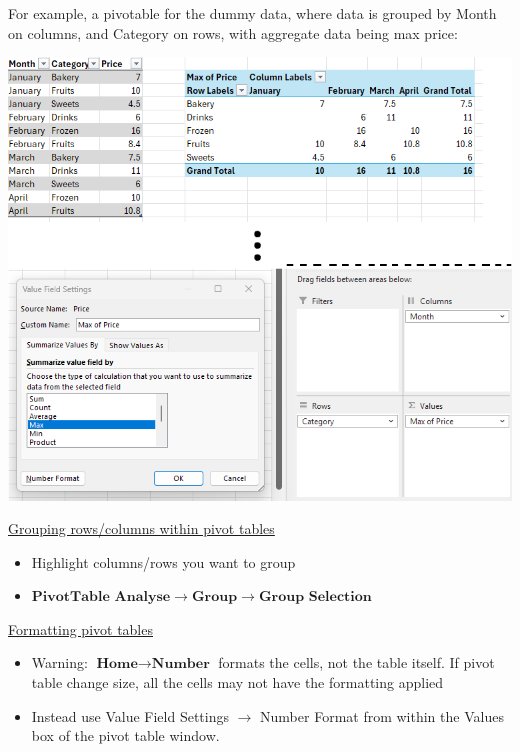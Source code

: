 \documentclass[8pt]{extarticle}
\begin{document}
\begin{multicols}{3}
\columnbreak
For example, a pivotable for the dummy data, where data is grouped by Month on columns, and Category on rows, with aggregate data being max price:
\begin{center}
        \includegraphics[width=0.9\columnwidth]{images/pivottable-example.png}
    \end{center}

\begin{center}
    \underline{Grouping rows/columns within pivot tables}
\end{center}

\begin{itemize}
    \item Highlight columns/rows you want to group
    \item $\textbf{PivotTable Analyse} \rightarrow \textbf{Group} \rightarrow \textbf{Group Selection}$
\end{itemize}

\begin{center}
    \underline{Formatting pivot tables}
\end{center}

\begin{itemize}
    \item Warning: $\textbf{Home} \rightarrow \textbf{Number}$ formats the cells, not the table itself. If pivot table change size, all the cells may not have the formatting applied
    \item Instead use Value Field Settings $\rightarrow$ Number Format from within the Values box of the pivot table window.
\end{itemize}


\end{multicols}
\end{document}
